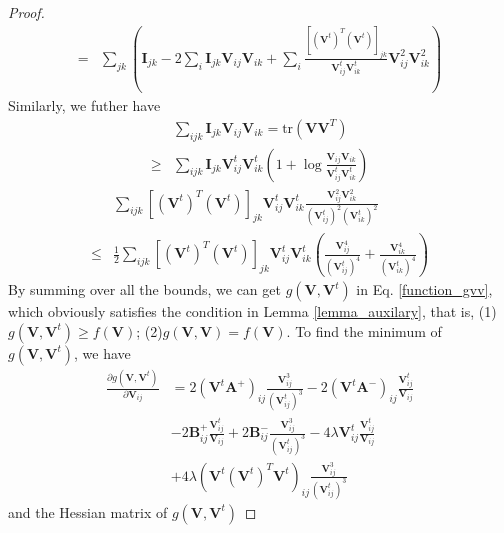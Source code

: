 \documentclass[10pt,journal,compsoc]{IEEEtran}
\newcommand{\tr}{\mathrm{tr}}
\begin{document}
\begin{proof}
\begin{align}
=& \sum_{jk} \left( \mathbf{I}_{jk} - 2\sum_{i} \mathbf{I}_{jk} \mathbf{V}_{ij} \mathbf{V}_{ik} + \sum_{i} \frac{[(\mathbf{V}^{t})^T(\mathbf{V}^{t})]_{jk} }{ \mathbf{V}_{ij}^{t} \mathbf{V}_{ik}^{t} } \mathbf{V}_{ij}^2 \mathbf{V}_{ik}^2 \right) \nonumber 
\end{align}
Similarly, we futher have 
\begin{align}
&\sum_{ijk} \mathbf{I}_{jk} \mathbf{V}_{ij} \mathbf{V}_{ik} = \tr(\mathbf{V} \mathbf{V}^T ) \nonumber \\
\geq&  \sum_{ijk} \mathbf{I}_{jk}\mathbf{V}_{ij}^t \mathbf{V}_{ik}^t  ( 1 + \log \frac{\mathbf{V}_{ij} \mathbf{V}_{ik}}{\mathbf{V}_{ij}^t \mathbf{V}_{ik}^t} ) 
\end{align}
\begin{align}
& \sum_{ijk}  [(\mathbf{V}^{t})^T(\mathbf{V}^{t})]_{jk} \mathbf{V}_{ij}^{t} \mathbf{V}_{ik}^{t} \frac{\mathbf{V}_{ij}^2 \mathbf{V}_{ik}^2}{ (\mathbf{V}_{ij}^{t})^{2} (\mathbf{V}_{ik}^{t})^{2} } \nonumber \\
\leq & \frac{1}{2} \sum_{ijk}   [(\mathbf{V}^{t})^T(\mathbf{V}^{t})]_{jk} \mathbf{V}_{ij}^{t} \mathbf{V}_{ik}^{t} \left( \frac{\mathbf{V}_{ij}^{4}}{(\mathbf{V}_{ij}^{t})^{4}} + \frac{\mathbf{V}_{ik}^{4}}{(\mathbf{V}_{ik}^{t})^{4}} \right)
\end{align}
By summing over all the bounds, we can get $\mathit{g}(\mathbf{V}, \mathbf{V}^t)$ in Eq. \eqref{function_gvv}, which obviously satisfies the condition in Lemma \ref{lemma_auxilary}, that is, (1) $\mathit{g}(\mathbf{V}, \mathbf{V}^t) \geq \mathit{f}(\mathbf{V})$; (2)$\mathit{g}(\mathbf{V}, \mathbf{V}) = \mathit{f}(\mathbf{V})$.
To find the minimum of $\mathit{g}(\mathbf{V}, \mathbf{V}^t)$, we have
\begin{align}
\frac{\partial \mathit{g}(\mathbf{V}, \mathbf{V}^t)}{\partial \mathbf{V}_{ij}} &= 2(\mathbf{V}^t \mathbf{A}^{+})_{ij} \frac{\mathbf{V}_{ij}^{3}}{(\mathbf{V}_{ij}^{t})^3}  - 2 (\mathbf{V}^t \mathbf{A}^{-})_{ij} \frac{\mathbf{V}_{ij}^{t}} {\mathbf{V}_{ij}} \nonumber \\
& - 2 \mathbf{B}_{ij}^{+} \frac{\mathbf{V}_{ij}^{t}} {\mathbf{V}_{ij}}  + 2 \mathbf{B}_{ij}^{-} \frac{\mathbf{V}_{ij}^3 }{(\mathbf{V}_{ij}^{t})^{3}}  - 4 \lambda \mathbf{V}_{ij}^t\frac{\mathbf{V}_{ij}^t}{\mathbf{V}_{ij}} \nonumber \\
&+ 4 \lambda \left(\mathbf{V}^{t} (\mathbf{V}^{t})^T\mathbf{V}^{t} \right)_{ij} \frac{\mathbf{V}_{ij}^3 }{(\mathbf{V}_{ij}^{t})^{3}} 
\end{align}
and the Hessian matrix of $\mathit{g}(\mathbf{V}, \mathbf{V}^t)$

\end{proof}
\end{document}
